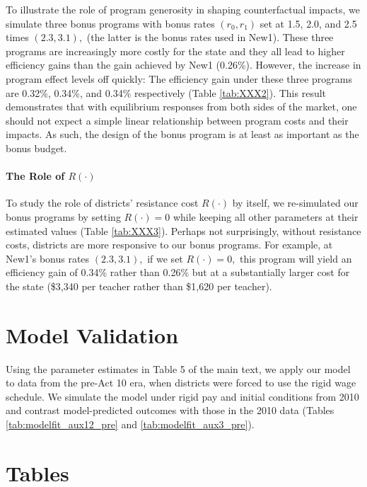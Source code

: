 \documentclass[notitlepage,12pt]{article}%
\begin{document}
To illustrate the role of program generosity in shaping counterfactual
impacts, we simulate three bonus programs with bonus rates $\left(
r_{0},r_{1}\right)  $ set at 1.5, 2.0, and 2.5 times $(2.3,3.1),$ (the latter
is the bonus rates used in New1). These three programs are increasingly more
costly for the state and they all lead to higher efficiency gains than the
gain achieved by New1 (0.26\%). However, the increase in program effect levels
off quickly: The efficiency gain under these three programs are 0.32\%,
0.34\%, and 0.34\% respectively (Table \ref{tab:XXX2}). This result
demonstrates that with equilibrium responses from both sides of the market,
one should not expect a simple linear relationship between program costs and
their impacts. As such, the design of the bonus program is at least as
important as the bonus budget.

\paragraph{The Role of $R\left(  \cdot\right)  $}

To study the role of districts' resistance cost $R\left(  \cdot\right)  $ by
itself, we re-simulated our bonus programs by setting $R\left(  \cdot\right)
=0$ while keeping all other parameters at their estimated values (Table
\ref{tab:XXX3}). Perhaps not surprisingly, without resistance costs, districts
are more responsive to our bonus programs. For example, at New1's bonus rates
$(2.3,3.1),$ if we set $R\left(  \cdot\right)  =0,$ this program will yield an
efficiency gain of 0.34\% rather than 0.26\% but at a substantially larger
cost for the state (\$3,340 per teacher rather than \$1,620 per teacher).

\section{Model Validation}
Using the parameter estimates in Table 5 of the main text, we apply our model to data from the
pre-Act 10 era, when districts were forced to use the rigid wage schedule. We
simulate the model under rigid pay and initial conditions from 2010 and
contrast model-predicted outcomes with those in the 2010 data (Tables
\ref{tab:modelfit_aux12_pre} and \ref{tab:modelfit_aux3_pre}). 

\pagebreak\clearpage


\section*{Tables}
\end{document}
